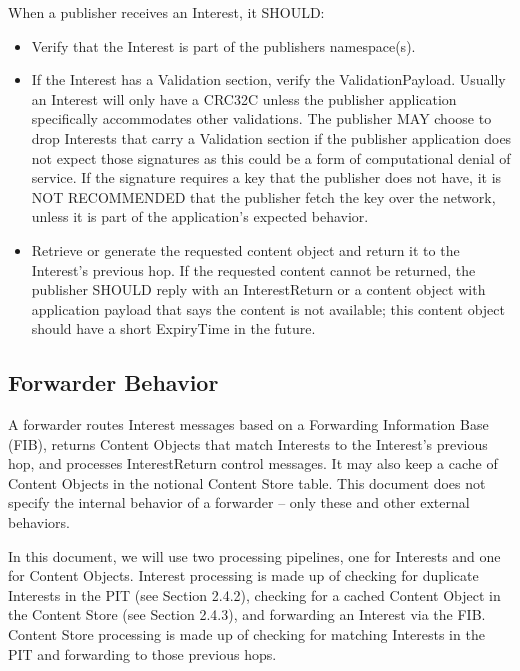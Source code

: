 \documentclass[12pt]{report}
\begin{document}
When a publisher receives an Interest, it SHOULD:

\begin{itemize}
\item Verify that the Interest is part of the publishers namespace(s).

\item If the Interest has a Validation section, verify the
    ValidationPayload.  Usually an Interest will only have a CRC32C
    unless the publisher application specifically accommodates other
    validations.  The publisher MAY choose to drop Interests that
    carry a Validation section if the publisher application does not
    expect those signatures as this could be a form of computational
    denial of service.  If the signature requires a key that the
    publisher does not have, it is NOT RECOMMENDED that the publisher
    fetch the key over the network, unless it is part of the
    application's expected behavior.

\item Retrieve or generate the requested content object and return it to
    the Interest's previous hop.  If the requested content cannot be
    returned, the publisher SHOULD reply with an InterestReturn or a
    content object with application payload that says the content is
    not available; this content object should have a short ExpiryTime
    in the future.
\end{itemize}

\subsection{Forwarder Behavior}
A forwarder routes Interest messages based on a Forwarding
Information Base (FIB), returns Content Objects that match Interests
to the Interest's previous hop, and processes InterestReturn control
messages.  It may also keep a cache of Content Objects in the
notional Content Store table.  This document does not specify the
internal behavior of a forwarder -- only these and other external
behaviors.

In this document, we will use two processing pipelines, one for
Interests and one for Content Objects.  Interest processing is made
up of checking for duplicate Interests in the PIT (see
Section 2.4.2), checking for a cached Content Object in the Content
Store (see Section 2.4.3), and forwarding an Interest via the FIB.
Content Store processing is made up of checking for matching
Interests in the PIT and forwarding to those previous hops.
\end{document}
